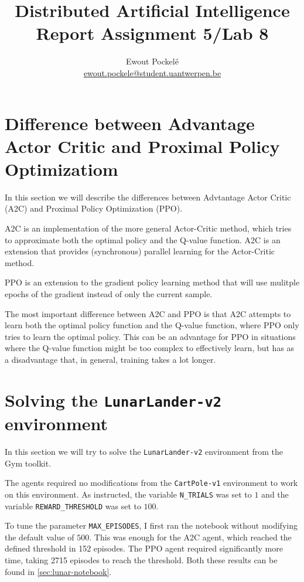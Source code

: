 \documentclass{article}
\title{Distributed Artificial Intelligence \\ \large{Report Assignment 5/Lab 8}}
\author{Ewout Pockelé \\ \href{mailto:ewout.pockele@student.uantwerpen.be}{ewout.pockele@student.uantwerpen.be}}
\begin{document}
 \maketitle

 \tableofcontents

 \section[Difference between A2C and PPO]{Difference between Advantage Actor 
   Critic and Proximal Policy Optimizatiom}
  In this section we will describe the differences between Advtantage Actor 
  Critic (A2C) and Proximal Policy Optimization (PPO).

  A2C is an implementation of the more general Actor-Critic method, which tries
  to approximate both the optimal policy and the Q-value function.  A2C is an
  extension that provides (synchronous) parallel learning for the Actor-Critic
  method. \cite[p.~62]{mets-policy-gradient}

  PPO is an extension to the gradient policy learning method that will use
  mulitple epochs of the gradient instead of only the current sample.
  \cite[p.~64]{mets-policy-gradient}

  The most important difference between A2C and PPO is that A2C attempts to
  learn both the optimal policy function and the Q-value function, where PPO
  only tries to learn the optimal policy.  This can be an advantage for PPO in
  situations where the Q-value function might be too complex to effectively
  learn, but has as a disadvantage that, in general, training takes a lot
  longer.

 \section{Solving the \texttt{LunarLander-v2} environment}
  In this section we will try to solve the \texttt{LunarLander-v2} environment
  from the Gym toolkit\cite{gym}.

  The agents required no modifications from the \texttt{CartPole-v1}
  environment to work on this environment.  As instructed, the variable
  \texttt{N\_TRIALS} was set to $1$ and the variable \texttt{REWARD\_THRESHOLD}
  was set to $100$.

  To tune the parameter \texttt{MAX\_EPISODES}, I first ran the notebook
  without modifying the default value of $500$.  This was enough for the A2C
  agent, which reached the defined threshold in 152 episodes.  The PPO agent
  required significantly more time, taking 2715 episodes to reach the threshold.
  Both these results can be found in \autoref{sec:lunar-notebook}.
\end{document}
